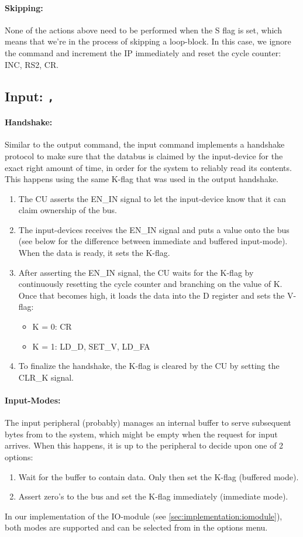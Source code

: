 \documentclass{article}
\begin{document}
\paragraph{Skipping:} None of the actions above need to be performed when the S flag is set, which means that we're in the process of skipping a loop-block. In this case, we ignore the command and increment the IP immediately and reset the cycle counter: INC, RS2, CR.

\subsection{Input: \texttt{,}} \label{sec:sequences:input}
\paragraph{Handshake:} Similar to the output command, the input command implements a handshake protocol to make sure that the databus is claimed by the input-device for the exact right amount of time, in order for the system to reliably read its contents. This happens using the same K-flag that was used in the output handshake.
\begin{enumerate}
\item The CU asserts the EN\_IN signal to let the input-device know that it can claim ownership of the bus.
\item The input-devices receives the EN\_IN signal and puts a value onto the bus (see below for the difference between immediate and buffered input-mode). When the data is ready, it sets the K-flag.
\item After asserting the EN\_IN signal, the CU waits for the K-flag by continuously resetting the cycle counter and branching on the value of K. Once that becomes high, it loads the data into the D register and sets the V-flag:
  \begin{itemize}
  \item K = 0: CR
  \item K = 1: LD\_D, SET\_V, LD\_FA
  \end{itemize}
\item To finalize the handshake, the K-flag is cleared by the CU by setting the CLR\_K signal.  
\end{enumerate}

\paragraph{Input-Modes:} The input peripheral (probably) manages an internal buffer to serve subsequent bytes from to the system, which might be empty when the request for input arrives. When this happens, it is up to the peripheral to decide upon one of 2 options:
\begin{enumerate}
\item Wait for the buffer to contain data. Only then set the K-flag (buffered mode).
\item Assert zero's to the bus and set the K-flag immediately (immediate mode).
\end{enumerate}
In our implementation of the IO-module (see \ref{sec:implementation:iomodule}), both modes are supported and can be selected from in the options menu.
\end{document}

